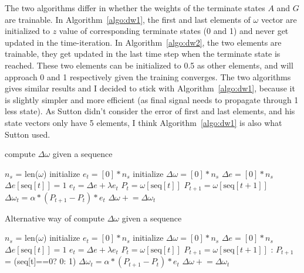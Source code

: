 \documentclass{article}
\newcommand{\pluseq}{\mathrel{+}=}
\begin{document}
The two algorithms differ in whether the weights of the terminate states $A$ and $G$ are trainable. In Algorithm~\ref{algo:dw1}, the first and last elements of $\omega$ vector are initialized to $z$ value of corresponding terminate states (0 and 1) and never get updated in the time-iteration. In Algorithm~\ref{algo:dw2}, the two elements are trainable, they get updated in the last time step when the terminate state is reached. These two elements can be initialized to 0.5 as other elements, and will approach 0 and 1 respectively given the training converges. The two algorithms gives similar results and I decided to stick with Algorithm~\ref{algo:dw1}, because it is slightly simpler and more efficient (as final signal needs to propagate through 1 less state). As Sutton didn't consider the error of first and last elements, and his state vectors only have 5 elements, I think Algorithm~\ref{algo:dw1} is also what Sutton used.

\begin{algorithm}[h!]
\caption{compute $\Delta\omega$ given a sequence}
\begin{algorithmic}
    \Statex {}
    \State $n_s$ = len($\omega$) 
    \State initialize $e_t = [0]*n_s$ 
    \State initialize $\Delta\omega = [0]*n_s$ 
    \State     $\Delta e = [0]*n_s$ 
    \State     $\Delta e[\mathrm{seq}[t]] = 1$ 
    \State     $e_t = \Delta e + \lambda e_t$ 
    \State     $P_t = \omega[\mathrm{seq}[t]]$ 
    \State     $P_{t+1} = \omega[\mathrm{seq}[t+1]]$ 
    \State     $\Delta \omega_t = \alpha * (P_{t+1} - P_t) * e_t$ 
    \State     $\Delta \omega \pluseq \Delta \omega_t $
    \EndFor
\EndFunction
\end{algorithmic}
\label{algo:dw1}
\end{algorithm}

\begin{algorithm}[h!]
\caption{Alternative way of compute $\Delta\omega$ given a sequence}
\begin{algorithmic}
    \Statex {}
    \State $n_s$ = len($\omega$) 
    \State initialize $e_t = [0]*n_s$ 
    \State initialize $\Delta\omega = [0]*n_s$ 
    \State $\Delta e = [0]*n_s$ 
    \State $\Delta e[\mathrm{seq}[t]] = 1$ 
    \State $e_t = \Delta e + \lambda e_t$ 
    \State $P_t = \omega[\mathrm{seq}[t]]$ 
            \State $P_{t+1} = \omega[\mathrm{seq}[t+1]]$ 
        \Else:
            \State $P_{t+1}$ = (seq[t]==0? 0: 1)
        \EndIf
    \State     $\Delta \omega_t = \alpha * (P_{t+1} - P_t) * e_t$ 
    \State     $\Delta \omega \pluseq \Delta \omega_t $
    \EndFor
\EndFunction
\end{algorithmic}
\label{algo:dw2}
\end{algorithm}
\end{document}
